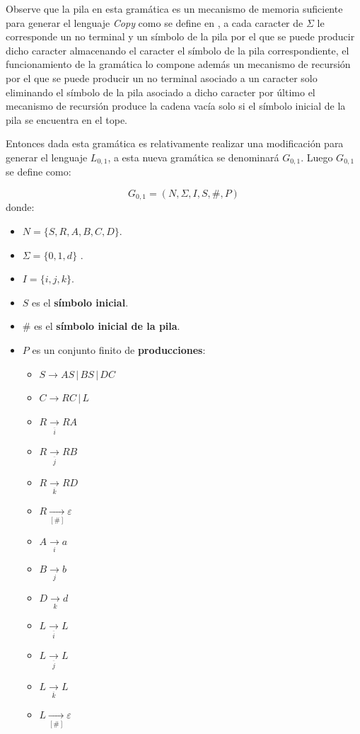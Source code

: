 Observe que la pila en esta gramática es un mecanismo de memoria suficiente para generar el lenguaje \textit{Copy} como se
define en \cite{globalIndexLanguages}, a cada caracter de $\Sigma$ le corresponde un no terminal y un símbolo de la pila 
por el que se puede producir dicho caracter almacenando el caracter el símbolo de la pila correspondiente, el funcionamiento 
de la gramática lo compone además un mecanismo de recursión por el que se puede producir un no terminal asociado a un caracter
solo eliminando el símbolo de la pila asociado a dicho caracter por último el mecanismo de recursión produce la cadena vacía
solo si el símbolo inicial de la pila se encuentra en el tope.

Entonces dada esta gramática es relativamente realizar una modificación para generar el lenguaje $L_{0,1}$,
a esta nueva gramática se denominará $G_{0,1}$. Luego $G_{0,1}$ se define como:

$$
    G_{0,1} = (N, \Sigma, I, S, \#, P) 
$$
donde:

\begin{itemize}
    \item $N= \{S,R,A,B,C,D\}$.
    \item \( \Sigma=\{0,1,d\} \) .
    \item $I=\{i,j,k\}$.
    \item $S$ es el \textbf{símbolo inicial}.
    \item $\#$ es el \textbf{símbolo inicial de la pila}.
    \item $P$ es un conjunto finito de \textbf{producciones}:
          \begin{multicols}{2}
              \begin{itemize}
                  \item $S\to AS\,|\,BS\,|\,DC$
                  \item $C\to RC\,|\,L$
                  \item $R\underset{\overline{i}}{\to} RA$
                  \item $R\underset{\overline{j}}{\to} RB$
                  \item $R\underset{\overline{k}}{\to} RD$
                        
                  \item $R\underset{[\#]}{\to} \varepsilon$
                  \item $A\underset{i}{\to} a$
                  \item $B\underset{j}{\to} b$
                  \item $D\underset{k}{\to} d$
                  \item $L\underset{\overline{i}}{\to} L$
                  \item $L\underset{\overline{j}}{\to} L$
                  \item $L\underset{\overline{k}}{\to} L$
                  \item $L\underset{[\#]}{\to} \varepsilon$
              \end{itemize}
          \end{multicols}
\end{itemize}


